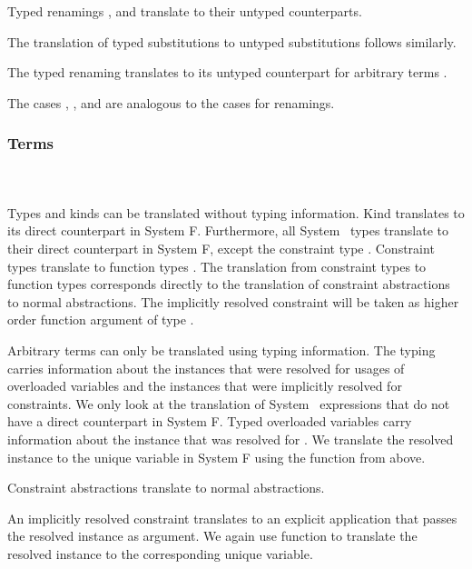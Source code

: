 \noindent Typed renamings ,  and  translate to their untyped counterparts. 

\noindent The translation of typed substitutions to untyped substitutions follows similarly.
\DPTSub 

\noindent The typed renaming  translates to its untyped counterpart for arbitrary terms .

\noindent The cases , ,  and  are analogous to the cases for renamings. 

\subsubsection{Terms}\hfill\\\\
Types and kinds can be translated without typing information. Kind  translates to its direct counterpart in System F. 
Furthermore, all System \Fo\ types translate to their direct counterpart in System F, except the constraint type \Constr{[}  \Constr{:}  \Constr{]⇒} .
\DPTType
Constraint types \Constr{[}  \Constr{:}  \Constr{]⇒}  translate to function types   . 
The translation from constraint types to function types corresponds directly to the translation of constraint abstractions to normal abstractions. 
The implicitly resolved constraint will be taken as higher order function argument of type .

\noindent Arbitrary terms can only be translated using typing information.
The typing carries information about the instances that were resolved for usages of overloaded variables and the instances that were implicitly resolved for constraints. 
We only look at the translation of System \Fo\ expressions that do not have a direct counterpart in System F.
\DPTTerms
Typed overloaded variables  carry information about the instance that was resolved for .
We translate the resolved instance to the unique variable in System F using the  function from above.

\noindent Constraint abstractions translate to normal abstractions. 

\noindent An implicitly resolved constraint translates to an explicit application that passes the resolved instance as argument. We again use function  to translate the resolved instance to the corresponding unique variable. 

